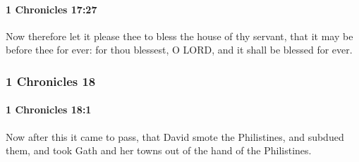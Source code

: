 		\paragraph{1 Chronicles 17:27} %
			\label{1CHRONICLES-17-27}

			Now therefore let it please thee to bless the house of thy servant, that it may be before thee for ever: for thou blessest, O LORD, and it shall be blessed for ever.

	\subsubsection{1 Chronicles 18} %
		\label{1CHRONICLES-18}

		\paragraph{1 Chronicles 18:1} %
			\label{1CHRONICLES-18-1}

			Now after this it came to pass, that David smote the Philistines, and subdued them, and took Gath and her towns out of the hand of the Philistines.

